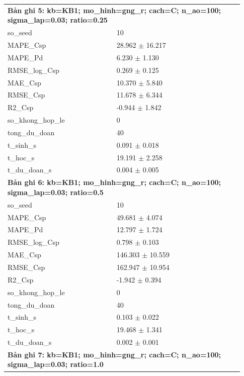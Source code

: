 \begin{longtable}{p{0.43\linewidth}p{0.50\linewidth}}
\midrule
\multicolumn{2}{p{0.95\linewidth}}{\textbf{Bản ghi 5: kb=KB1; mo\_hinh=gng\_r; cach=C; n\_ao=100; sigma\_lap=0.03; ratio=0.25}} \\
so\_\allowbreak seed & 10 \\
MAPE\_\allowbreak Csp & 28.962 $\pm$ 16.217 \\
MAPE\_\allowbreak Pd & 6.230 $\pm$ 1.130 \\
RMSE\_\allowbreak log\_\allowbreak Csp & 0.269 $\pm$ 0.125 \\
MAE\_\allowbreak Csp & 10.370 $\pm$ 5.840 \\
RMSE\_\allowbreak Csp & 11.678 $\pm$ 6.344 \\
R2\_\allowbreak Csp & -0.944 $\pm$ 1.842 \\
so\_\allowbreak khong\_\allowbreak hop\_\allowbreak le & 0 \\
tong\_\allowbreak du\_\allowbreak doan & 40 \\
t\_\allowbreak sinh\_\allowbreak s & 0.091 $\pm$ 0.018 \\
t\_\allowbreak hoc\_\allowbreak s & 19.191 $\pm$ 2.258 \\
t\_\allowbreak du\_\allowbreak doan\_\allowbreak s & 0.004 $\pm$ 0.005 \\
\midrule
\multicolumn{2}{p{0.95\linewidth}}{\textbf{Bản ghi 6: kb=KB1; mo\_hinh=gng\_r; cach=C; n\_ao=100; sigma\_lap=0.03; ratio=0.5}} \\
so\_\allowbreak seed & 10 \\
MAPE\_\allowbreak Csp & 49.681 $\pm$ 4.074 \\
MAPE\_\allowbreak Pd & 12.797 $\pm$ 1.724 \\
RMSE\_\allowbreak log\_\allowbreak Csp & 0.798 $\pm$ 0.103 \\
MAE\_\allowbreak Csp & 146.303 $\pm$ 10.559 \\
RMSE\_\allowbreak Csp & 162.947 $\pm$ 10.954 \\
R2\_\allowbreak Csp & -1.942 $\pm$ 0.394 \\
so\_\allowbreak khong\_\allowbreak hop\_\allowbreak le & 0 \\
tong\_\allowbreak du\_\allowbreak doan & 40 \\
t\_\allowbreak sinh\_\allowbreak s & 0.103 $\pm$ 0.022 \\
t\_\allowbreak hoc\_\allowbreak s & 19.468 $\pm$ 1.341 \\
t\_\allowbreak du\_\allowbreak doan\_\allowbreak s & 0.002 $\pm$ 0.001 \\
\midrule
\multicolumn{2}{p{0.95\linewidth}}{\textbf{Bản ghi 7: kb=KB1; mo\_hinh=gng\_r; cach=C; n\_ao=100; sigma\_lap=0.03; ratio=1.0}} \\

\end{longtable}
